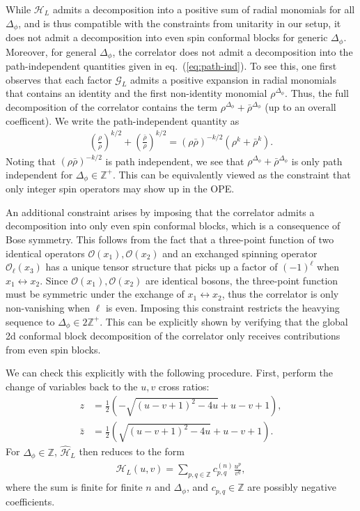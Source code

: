 \documentclass[a4paper,11pt]{article}
\theoremstyle{plain}
\theoremstyle{definition}
\theoremstyle{remark}
\newcommand{\rhob}{{\bar{\rho}}}
\newcommand{\cO}{\mathcal O}
\newcommand{\ba}{\begin{equation} \begin{aligned}}
\newcommand{\ea}{\end{aligned} \end{equation}}
\newcommand{\Df}{\Delta_\phi}
\begin{document}
While $\mathcal{H}_L$ admits a decomposition into a positive sum of radial monomials for all $\Df$, and is thus compatible with the constraints from unitarity in our setup, it does not admit a decomposition into even spin conformal blocks for generic $\Df$. Moreover, for general $\Df$, the correlator does not admit a decomposition into the path-independent quantities given in eq.~(\ref{eq:path-ind}). To see this, one first observes that each factor $\mathcal{G}_L$ admits a positive expansion in radial monomials that contains an identity and the first non-identity monomial $\rho^{\Df}$. Thus, the full decomposition of the correlator contains the term $\rho^{\Df} + \rhob^{\Df}$ (up to an overall coefficent). We write the path-independent quantity as
\ba
\left(\frac{\rho}{\rhob}\right)^{k/2} + \left(\frac{\rhob}{\rho}\right)^{k/2}  = (\rho \rhob)^{-k/2} \left( \rho^k + \rhob^k \right).
\ea
Noting that $(\rho \rhob)^{-k/2}$ is path independent, we see that $\rho^{\Df} + \rhob^{\Df}$ is only path independent for $\Df \in \mathbb{Z}^+$. This can be equivalently viewed as the constraint that only integer spin operators may show up in the OPE. 

An additional constraint arises by imposing that the correlator admits a decomposition into only even spin conformal blocks, which is a consequence of Bose symmetry. This follows from the fact that a three-point function of two identical operators $\cO(x_1),\cO(x_2)$ and an exchanged spinning operator $\cO_\ell(x_3)$ has a unique tensor structure that picks up a factor of $(-1)^\ell$ when $x_1 \leftrightarrow x_2$. Since $\cO(x_1),\cO(x_2)$ are identical bosons, the three-point function must be symmetric under the exchange of $x_1 \leftrightarrow x_2$, thus the correlator is only non-vanishing when $\ell$ is even. Imposing this constraint restricts the heavying sequence to $\Df \in 2\mathbb{Z}^+$. This can be explicitly shown by verifying that the global 2d conformal block decomposition of the correlator only receives contributions from even spin blocks. 

We can check this explicitly with the following procedure. First, perform the change of variables back to the $u,v$ cross ratios:
\ba
z &= \frac{1}{2} \left(-\sqrt{(u-v+1)^2-4 u}+u-v+1\right),\\
\bar{z} &=\frac{1}{2} \left(\sqrt{(u-v+1)^2-4 u}+u-v+1\right).
\ea
For $\Df \in \mathbb{Z}$, $\widehat{\mathcal{H}}_L$ then reduces to the form
\ba
\widehat{\mathcal{H}}_L(u,v) = \sum_{p,q \in \mathbb{Z}} c^{(n)}_{p,q} \frac{u^p}{v^q},
\label{uvexp}
\ea
where the sum is finite for finite $n$ and $\Df$, and $c_{p,q} \in \mathbb{Z}$ are possibly negative coefficients. 
\end{document}
